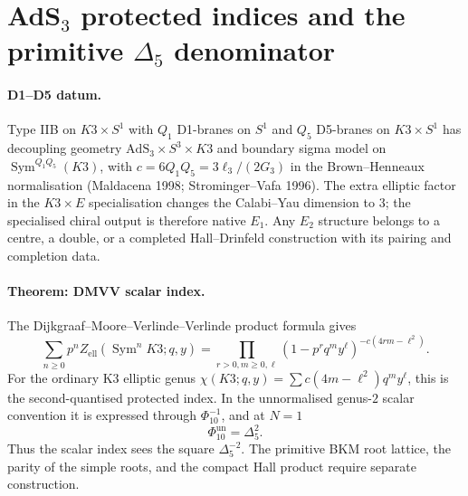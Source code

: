 
\providecommand{\kBKM}{\kappa_{\mathrm{BKM}}}
\providecommand{\kch}{\kappa_{\mathrm{ch}}}
\providecommand{\kcat}{\kappa_{\mathrm{cat}}}
\providecommand{\kfib}{\kappa_{\mathrm{fiber}}}
\providecommand{\DBKM}{\Delta^{\mathrm{BKM}}}
\providecommand{\PhiPhys}{\Phi^{\mathrm{phys}}}
\providecommand{\Z}{\mathbb{Z}}
\providecommand{\fg}{\mathfrak{g}}
\providecommand{\SymInf}{\mathrm{Sym}^{\infty}}
\providecommand{\AdS}{\mathrm{AdS}}
\providecommand{\Wlambda}{\mathcal{W}_\infty[\lambda]}

\section*{AdS$_3$ protected indices and the primitive $\Delta_5$ denominator}
\label{wn:sec:ads3-protected-indices-delta5}

\paragraph{D1--D5 datum.}
Type IIB on $K3\times S^1$ with $Q_1$ D1-branes on $S^1$ and
$Q_5$ D5-branes on $K3\times S^1$ has decoupling geometry
$\AdS_3\times S^3\times K3$ and boundary sigma model on
$\operatorname{Sym}^{Q_1Q_5}(K3)$, with
$c=6Q_1Q_5=3\ell_3/(2G_3)$ in the Brown--Henneaux normalisation
(Maldacena 1998; Strominger--Vafa 1996). The extra elliptic factor in
the $K3\times E$ specialisation changes the Calabi--Yau dimension to
$3$; the specialised chiral output is therefore native $E_1$. Any
$E_2$ structure belongs to a centre, a double, or a completed
Hall--Drinfeld construction with its pairing and completion data.

\paragraph{Theorem: DMVV scalar index.}
The Dijkgraaf--Moore--Verlinde--Verlinde product formula gives
\[
  \sum_{n\geq 0}p^n Z_{\mathrm{ell}}(\operatorname{Sym}^n K3;q,y)
  =
  \prod_{r>0,m\geq 0,\ell}
  (1-p^r q^m y^\ell)^{-c(4rm-\ell^2)} .
\]
For the ordinary K3 elliptic genus
$\chi(K3;q,y)=\sum c(4m-\ell^2)q^m y^\ell$, this is the
second-quantised protected index. In the unnormalised genus-$2$ scalar
convention it is expressed through $\Phi_{10}^{-1}$, and at $N=1$
\[
  \Phi_{10}^{\mathrm{un}}=\Delta_5^2.
\]
Thus the scalar index sees the square $\Delta_5^{-2}$. The primitive BKM
root lattice, the parity of the simple roots, and the compact Hall
product require separate construction.

